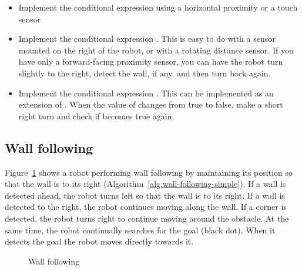 \begin{framed}
\begin{itemize}
\item Implement the conditional expression  using a horizontal proximity or a touch sensor.
\item Implement the conditional expression . This is easy to do with a sensor mounted on the right of the robot, or with a rotating distance sensor. If you have only a forward-facing proximity sensor, you can have the robot turn slightly to the right, detect the wall, if any, and then turn back again.
\item Implement the conditional expression . This can be implemented as an extension of . When the value of  changes from true to false, make a short right turn and check if  becomes true again.
\end{itemize}
\end{framed}

\subsection{Wall following}

Figure~\ref{fig.wall-following-simple} shows a robot performing wall following by maintaining its position so that the wall is to its right (Algorithm~\ref{alg.wall-following-simple}). If a wall is detected ahead, the robot turns left so that the wall is to its right. If a wall is detected to the right, the robot continues moving along the wall. If a corner is detected, the robot turns right to continue moving around the obstacle. At the same time, the robot continually searches for the goal (black dot). When it detects the goal the robot moves directly towards it.

\begin{figure}
\begin{center}
\caption{Wall following}\label{fig.wall-following-simple}
\end{center}
\end{figure}

